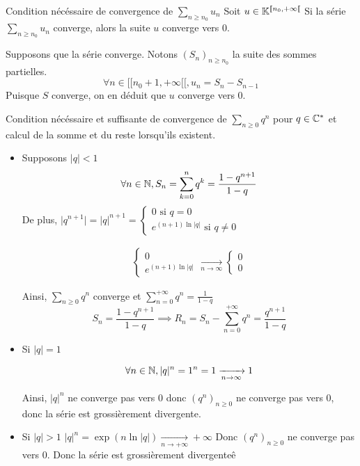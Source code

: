 \documentclass{article}
\renewenvironment{question_kholle}[2][ ]
{
	\subsection{\texorpdfstring{#2}{}}
	\notblank{#1}
	{
		\noindent #1
		\bigbreak
	}
	{}
	\begin{proof}
}
{
	\end{proof}
}
\begin{document}
\begin{question_kholle}{Condition nécéssaire de convergence de $\sum_{n \geqslant n_0} u_n$}
    Soit $u \in \mathbb K^{[ \! [ n_{0}, + \infty [ \![}$
    Si la série $\sum_{n\geqslant n_{0}}u_{n}$ converge, alors la suite $u$ converge vers $0$.
    
    Supposons que la série converge. Notons $(S_{n})_{n\geqslant n_{0}}$ la suite des sommes partielles.
$$\forall n \in [ \! [ n_{0}+1, +\infty [ \![, u_{n} = S_{n} - S_{n-1}$$
    Puisque $S$ converge, on en déduit que $u$ converge vers $0$.
\end{question_kholle}
\begin{question_kholle}{Condition nécéssaire et suffisante de convergence de $\sum_{n\geqslant 0}q^{n}$ pour $q \in \mathbb C^{*}$ et calcul de la somme et du reste lorsqu'ils existent.}
    \begin{itemize}[label=$\star$]
        \item Supposons $\lvert q \rvert<1$
        $$\forall n \in \mathbb N, S_{n} = \sum_{k=0}^{n}q^{k} = \frac{1-q^{n+1}}{1-q}$$
        De plus, $\lvert q^{n+1} \rvert=\lvert q \rvert^{n+1}= \left\{ \begin{array}{ll}0 \text{ si }q=0\\ e^{(n+1)\ln \lvert q \rvert} \text{ si }q\neq 0\end{array}\right.$
        
        \begin{align*}
            \left\{ \begin{array}{ll}
                0 \\
                e^{(n+1)\ln \lvert q \rvert } 
            \end{array}\right. \xrightarrow[n\to \infty]{} \left\{ \begin{array}{ll}
                0 \\
                0 
            \end{array}\right.
        \end{align*}
        
        Ainsi, $\sum_{n\geqslant 0}q^{n}$ converge et $\sum_{n=0}^{+\infty}q^{n}=\frac{1}{1-q}$
        $$S_{n} = \frac{1-q^{n+1}}{1-q} \implies R_{n} = S_{n} - \sum_{n=0}^{+\infty}q^{n}= \frac{q^{n+1}}{1-q}$$
        
        \item Si $\lvert q \rvert=1$
        
        $$\forall n \in \mathbb N, \lvert q \rvert ^{n} = 1^{n}=1 \xrightarrow[n \to \infty]{}1$$
        
        Ainsi, $\lvert q \rvert^{n}$ ne converge pas vers 0 donc $(q^{n})_{n\geqslant 0}$ ne converge pas vers 0, donc la série est grossièrement divergente.
        
        \item Si $\lvert q \rvert>1$
        $\lvert q \rvert^{n}=\exp(n \ln \lvert q \rvert) \xrightarrow[n\to +\infty]{} +\infty$
        Donc $(q^{n})_{n\geqslant 0}$ ne converge pas vers $0$. Donc la série est grossièrement divergenteê
    \end{itemize}
\end{question_kholle}
\end{document}
